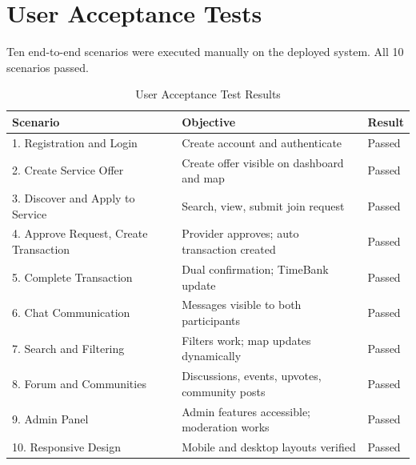 \documentclass[10pt,a4paper]{report}
\begin{document}
\section{User Acceptance Tests}

Ten end-to-end scenarios were executed manually on the deployed system. All 10 scenarios passed.

\begin{table}[h]
    \centering
    \begin{tabular}{|l|l|l|}
        \hline
        \textbf{Scenario}                          & \textbf{Objective}                             & \textbf{Result} \\
        \hline
        1. Registration and Login                  & Create account and authenticate                & Passed          \\
        \hline
        2. Create Service Offer                    & Create offer visible on dashboard and map      & Passed          \\
        \hline
        3. Discover and Apply to Service           & Search, view, submit join request              & Passed          \\
        \hline
        4. Approve Request, Create Transaction     & Provider approves; auto transaction created    & Passed          \\
        \hline
        5. Complete Transaction                    & Dual confirmation; TimeBank update             & Passed          \\
        \hline
        6. Chat Communication                      & Messages visible to both participants          & Passed          \\
        \hline
        7. Search and Filtering                    & Filters work; map updates dynamically          & Passed          \\
        \hline
        8. Forum and Communities                   & Discussions, events, upvotes, community posts  & Passed          \\
        \hline
        9. Admin Panel                             & Admin features accessible; moderation works    & Passed          \\
        \hline
        10. Responsive Design                      & Mobile and desktop layouts verified            & Passed          \\
        \hline
    \end{tabular}
    \caption{User Acceptance Test Results}
\end{table}
\end{document}
